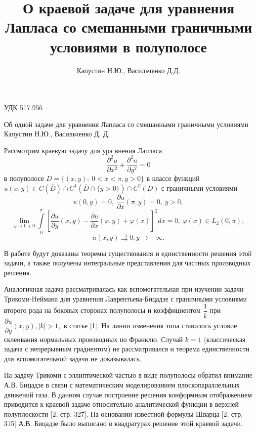 \documentclass[a4paper, 9pt]{article}
\title{О краевой задаче для уравнения Лапласа со смешанными граничными условиями в полуполосе}
\author{Капустин Н.Ю., Васильченко Д.Д.}
\date{}
\begin{document}
	УДК 517.956
	\begin{center}		
		\LARGE{
		 Об одной задаче для уравнения Лапласа со смешанными граничными условиями
		}
		\newline
		\large{Капустин Н.Ю., Васильченко Д. Д.}
		
	\end{center}
	\par
	Рассмотрим краевую задачу для ура внения Лапласа
	\begin{equation}
		\dfrac{\partial^2 u}{\partial x^2} +\dfrac{\partial^2 u}{\partial y^2} = 0
	\end{equation}
	в полуполосе $D = \{(x,y) :\  0 < x < \pi, y > 0\}$	в классе функций $u(x,y) \in C(\overline{D}) \cap C^1(\overline{D} \cap \{y > 0\}) \cap C^2 (D)$\newline
	с граничными условиями
	\begin{equation}
		u(0, y) = 0, \ \dfrac{\partial u}{\partial x} (\pi, y) = 0, \ y > 0, 
	\end{equation}
	\begin{equation}
		\lim\limits_{y \to 0 + 0} \int\limits_0^\pi \left[\dfrac{\partial u}{\partial y}(x,y) - \dfrac{\partial u}{\partial x}(x,y) + \varphi(x) \right]^2 dx = 0, \ \varphi(x) \in L_2(0,\pi) , 
	\end{equation}
	\begin{equation}
		u(x,y) \rightrightarrows 0, y \to +\infty. 
	\end{equation}
	
	В работе будут доказаны теоремы существования и единственности решения
	этой задачи, а также получены интегральные представления для частных
	производных решения.
	
	Аналогичная задача рассматривалась как вспомогательная при изучении задачи Трикоми-Неймана
	для уравнения Лаврентьева-Бицадзе с граничными условиями второго рода на боковых сторонах
	полуполосы и коэффициентом $\dfrac{1}{k}$ при
	$\dfrac{\partial u}{\partial y}(x,y), \vert k\vert>1, $ в статье [1].
	На линии изменения типа ставилось условие склеивания нормальных производных
	по Франклю. Случай $k=1$ (классическая задача с непрерывным градиентом)
	не рассматривался и теорема единственности для вспомогательной задачи
	не доказывалась.
	
	На задачу Трикоми с эллиптической частью в виде полуполосы обратил внимание
	А.В. Бицадзе в связи с математическим моделированием плоскопараллельных
	движений газа. В данном случае построение решения конформным отображением
	приводится к краевой задаче относительно аналитической функции в верхней
	полуплоскости [2, стр. 327]. На основании известной формулы Шварца [2, стр. 315]
	А.В. Бицадзе было выписано в квадратурах решение этой краевой задачи. 
	
\end{document}
